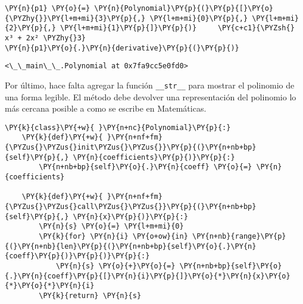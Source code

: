\begin{example}
\begin{tcolorbox}[breakable, size=fbox, boxrule=1pt, pad at break*=1mm,colback=cellbackground, colframe=cellborder]
\begin{Verbatim}[commandchars=\\\{\}]
\PY{n}{p1} \PY{o}{=} \PY{n}{Polynomial}\PY{p}{(}\PY{p}{[}\PY{o}{\PYZhy{}}\PY{l+m+mi}{3}\PY{p}{,} \PY{l+m+mi}{0}\PY{p}{,} \PY{l+m+mi}{2}\PY{p}{,} \PY{l+m+mi}{1}\PY{p}{]}\PY{p}{)}     \PY{c+c1}{\PYZsh{} x³ + 2x² \PYZhy{}3}
\PY{n}{p1}\PY{o}{.}\PY{n}{derivative}\PY{p}{(}\PY{p}{)}
\end{Verbatim}
\end{tcolorbox}

\begin{tcolorbox}[breakable, size=fbox, boxrule=.5pt, pad at break*=1mm, opacityfill=0]
\begin{Verbatim}[commandchars=\\\{\}]
<\_\_main\_\_.Polynomial at 0x7fa9cc5e0fd0>
\end{Verbatim}
\end{tcolorbox}
        
Por último, hace falta agregar la función \texttt{\_\_str\_\_} para
mostrar el polinomio de una forma legible. El método debe devolver una
representación del polinomio lo más cercana posible a como se escribe en
Matemáticas.

\begin{tcolorbox}[breakable, size=fbox, boxrule=1pt, pad at break*=1mm,colback=cellbackground, colframe=cellborder]
\begin{Verbatim}[commandchars=\\\{\}]
\PY{k}{class}\PY{+w}{ }\PY{n+nc}{Polynomial}\PY{p}{:}
    \PY{k}{def}\PY{+w}{ }\PY{n+nf+fm}{\PYZus{}\PYZus{}init\PYZus{}\PYZus{}}\PY{p}{(}\PY{n+nb+bp}{self}\PY{p}{,} \PY{n}{coefficients}\PY{p}{)}\PY{p}{:}
        \PY{n+nb+bp}{self}\PY{o}{.}\PY{n}{coeff} \PY{o}{=} \PY{n}{coefficients}

    \PY{k}{def}\PY{+w}{ }\PY{n+nf+fm}{\PYZus{}\PYZus{}call\PYZus{}\PYZus{}}\PY{p}{(}\PY{n+nb+bp}{self}\PY{p}{,} \PY{n}{x}\PY{p}{)}\PY{p}{:}
        \PY{n}{s} \PY{o}{=} \PY{l+m+mi}{0}
        \PY{k}{for} \PY{n}{i} \PY{o+ow}{in} \PY{n+nb}{range}\PY{p}{(}\PY{n+nb}{len}\PY{p}{(}\PY{n+nb+bp}{self}\PY{o}{.}\PY{n}{coeff}\PY{p}{)}\PY{p}{)}\PY{p}{:}
            \PY{n}{s} \PY{o}{+}\PY{o}{=} \PY{n+nb+bp}{self}\PY{o}{.}\PY{n}{coeff}\PY{p}{[}\PY{n}{i}\PY{p}{]}\PY{o}{*}\PY{n}{x}\PY{o}{*}\PY{o}{*}\PY{n}{i}
        \PY{k}{return} \PY{n}{s}
    

\end{Verbatim}
\end{tcolorbox}
\end{example}

